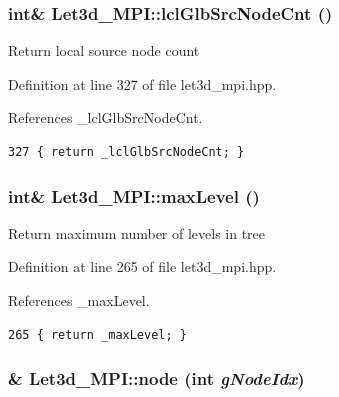 \subsubsection{\setlength{\rightskip}{0pt plus 5cm}int\& Let3d\_\-MPI::lcl\-Glb\-Src\-Node\-Cnt ()\hspace{0.3cm}{\tt  [inline]}}\label{classLet3d__MPI_52319021e6ad3f34cc15791c10d29672_52319021e6ad3f34cc15791c10d29672}


Return local source node count 

Definition at line 327 of file let3d\_\-mpi.hpp.

References \_\-lcl\-Glb\-Src\-Node\-Cnt.

\footnotesize\begin{verbatim}327 { return _lclGlbSrcNodeCnt; }
\end{verbatim}\normalsize 


\subsubsection{\setlength{\rightskip}{0pt plus 5cm}int\& Let3d\_\-MPI::max\-Level ()\hspace{0.3cm}{\tt  [inline]}}\label{classLet3d__MPI_fdc3ca03e415e2d7b0b1f708d3ab94bb_fdc3ca03e415e2d7b0b1f708d3ab94bb}


Return maximum number of levels in tree 

Definition at line 265 of file let3d\_\-mpi.hpp.

References \_\-max\-Level.

\footnotesize\begin{verbatim}265 { return _maxLevel; }
\end{verbatim}\normalsize 


\subsubsection{\& Let3d\_\-MPI::node (int {\em g\-Node\-Idx})\hspace{0.3cm}{\tt  [inline]}}\label{classLet3d__MPI_f259ccf218dbf0a04530841785f1a8b0_f259ccf218dbf0a04530841785f1a8b0}


